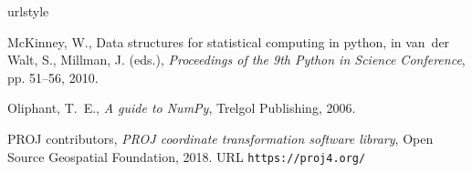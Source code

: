 \begin{thebibliography}{1}
\providecommand{\url}[1]{\texttt{#1}}
\providecommand{\urlprefix}{URL }
\expandafter\ifx\csname urlstyle\endcsname\relax
  \providecommand{\doi}[1]{doi:\discretionary{}{}{}#1}\else
  \providecommand{\doi}{doi:\discretionary{}{}{}\begingroup
  \urlstyle{rm}\Url}\fi

McKinney, W., Data structures for statistical computing in python, in van~der
  Walt, S., Millman, J. (eds.), \emph{Proceedings of the 9th Python in Science
  Conference}, pp. 51--56, 2010.

Oliphant, T.~E., \emph{A guide to {NumPy}}, Trelgol Publishing, 2006.

{PROJ contributors}, \emph{{PROJ} coordinate transformation software library},
  Open Source Geospatial Foundation, 2018.
\newline\urlprefix\url{https://proj4.org/}

\end{thebibliography}

\endinput
